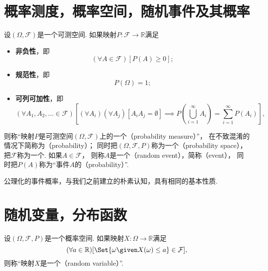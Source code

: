 \section{概率测度，概率空间，随机事件及其概率}
\begin{definition}
设\((\Omega,\mathcal{F})\)是一个可测空间.
如果映射\(P\colon \mathcal{F} \to \mathbb{R}\)满足\begin{itemize}
	\item {\rm\bf 非负性}，即\begin{equation*}
		(\forall A \in \mathcal{F})
		[
			P(A) \geq 0
		];
	\end{equation*}

	\item {\rm\bf 规范性}，即\begin{equation*}
		P(\Omega) = 1;
	\end{equation*}

	\item {\rm\bf 可列可加性}，即\begin{equation*}
		(\forall A_1,A_2,\dotsc \in \mathcal{F})
		[
			(\forall A_i)(\forall A_j)
			[
				A_i A_j = \emptyset
			]
			\implies
			P\left( \bigcup_{i=1}^\infty A_i \right)
			= \sum_{i=1}^\infty P(A_i)
		],
	\end{equation*}
\end{itemize}
则称“映射\(P\)是可测空间\((\Omega,\mathcal{F})\)上的一个（probability measure）”，
在不致混淆的情况下简称为（probability）；
同时把\((\Omega,\mathcal{F},P)\)称为一个（probability space），
把\(\mathcal{F}\)称为一个.
如果\(A \in \mathcal{F}\)，
则称\(A\)是一个（random event），简称（event），
同时把\(P(A)\)称为“事件\(A\)的（probability）”.
\end{definition}

公理化的事件概率，与我们之前建立的朴素认知，具有相同的基本性质.

\section{随机变量，分布函数}
\begin{definition}
设\((\Omega,\mathcal{F},P)\)是一个概率空间.
如果映射\(X\colon \Omega \to \mathbb{R}\)满足\begin{equation*}
	(\forall a \in \mathbb{R})
	[
		\Set{
			\omega
			\given
			X(\omega) \leq a
		}
		\in \mathcal{F}
	],
\end{equation*}
则称“映射\(X\)是一个（random variable）”.
\end{definition}

